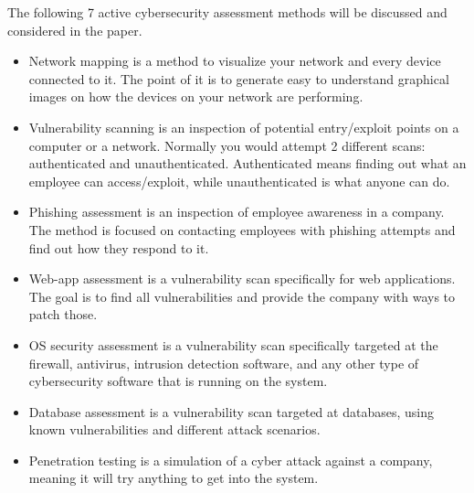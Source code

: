 The following 7 active cybersecurity assessment methods will be discussed and considered in the paper.
\begin{itemize}
    \item Network mapping is a method to visualize your network and every device connected to it. The point of it is to generate easy to understand graphical images on how the devices on your network are performing.\citep{WhatI7989243:online}
    \item Vulnerability scanning is an inspection of potential entry/exploit points on a computer or a network. Normally you would attempt 2 different scans: authenticated and unauthenticated. Authenticated means finding out what an employee can access/exploit, while unauthenticated is what anyone can do.\citep{Whatt4625369:online}
    \item Phishing assessment is an inspection of employee awareness in a company. The method is focused on contacting employees with phishing attempts and find out how they respond to it.\citep{Phish2261941:online}
    \item Web-app assessment is a vulnerability scan specifically for web applications. The goal is to find all vulnerabilities and provide the company with ways to patch those.\citep{Howse3584547:online}
    \item OS security assessment is a vulnerability scan specifically targeted at the firewall, antivirus, intrusion detection software, and any other type of cybersecurity software that is running on the system.\citep{Opera9350454:online}
    \item Database assessment is a vulnerability scan targeted at databases, using known vulnerabilities and different attack scenarios.\citep{Datab9544661:online}
    \item Penetration testing is a simulation of a cyber attack against a company, meaning it will try anything to get into the system.\citep{Whati8920180:online}
\end{itemize}

